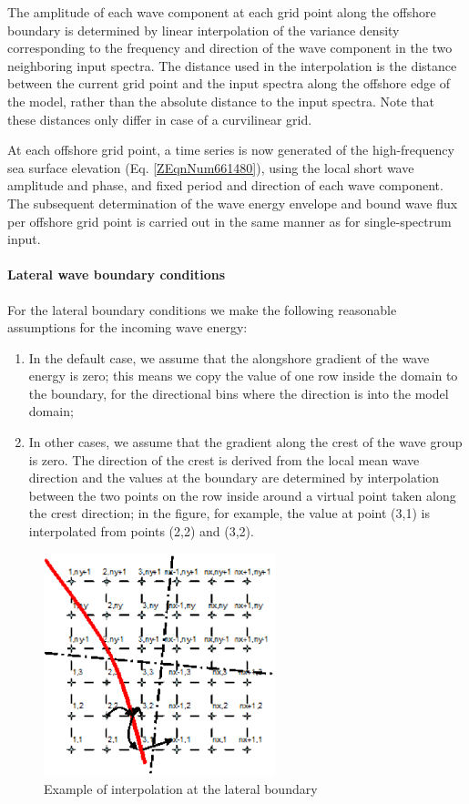 The amplitude of each wave component at each grid point along the offshore boundary is determined by linear interpolation of the variance density corresponding to the frequency and direction of the wave component in the two neighboring input spectra. The distance used in the interpolation is the distance between the current grid point and the input spectra along the offshore edge of the model, rather than the absolute distance to the input spectra. Note that these distances only differ in case of a curvilinear grid. 

At each offshore grid point, a time series is now generated of the high-frequency sea surface elevation (Eq. \eqref{ZEqnNum661480}), using the local short wave amplitude and phase, and fixed period and direction of each wave component. The subsequent determination of the wave energy envelope and bound wave flux per offshore grid point is carried out in the same manner as for single-spectrum input.

\paragraph{Lateral wave boundary conditions}

For the lateral boundary conditions we make the following reasonable assumptions for the incoming  wave energy:

\begin{enumerate}
\item  In the default case, we assume that the alongshore gradient of the wave energy is zero; this means we copy the value of one row inside the domain to the boundary, for the directional bins where the direction is into the model domain;

\item  In other cases, we assume that the gradient along the crest of the wave group is zero. The direction of the crest is derived from the local mean wave direction and the values at the boundary are determined by interpolation between the two points on the row inside around a virtual point taken along the crest direction; in the figure, for example, the value at point (3,1) is interpolated from points (2,2) and (3,2).
\end{enumerate}

\begin{figure}[h]
  \centering
  \includegraphics[width=0.6\textwidth]{image6}
  \caption{Example of interpolation at the lateral boundary}
  \label{fig:image6}
\end{figure}

